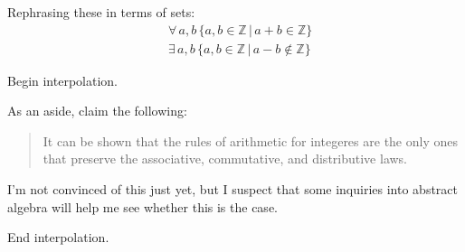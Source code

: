 \documentclass[leqno]{article}
\begin{document}
Rephrasing these in terms of sets:
\begin{align}
    &\forall \, a, b \, \{a, b \in \mathbb{Z} \,|\, a+b \in \mathbb{Z}\}\\
    &\exists \, a, b \, \{a, b \in \mathbb{Z} \,|\, a-b \not\in \mathbb{Z}\}
\end{align}

Begin interpolation.

As an aside, \textcite{fisherIntegratedAlgebraTrigonometry1962} claim the following:
\begin{quote}
    It can be shown that the rules of arithmetic
    for integeres are the only ones that preserve
    the associative, commutative, and distributive
    laws.
\end{quote}

I'm not convinced of this just yet, but I suspect that some inquiries into abstract algebra will help me see whether this is the case.

End interpolation.


\newpage
\printbibliography
\end{document}
